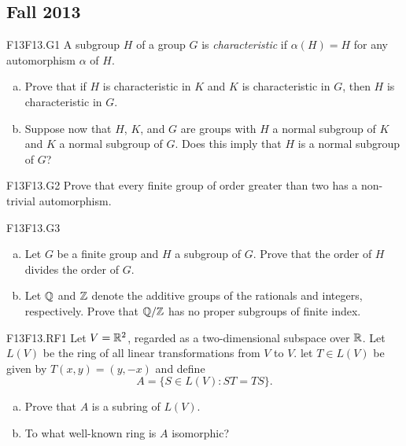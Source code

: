 \documentclass[../AlgebraQualSolutions.tex]{subfiles}
\begin{document}
	\subsection{Fall 2013}

	\begin{prob}{F13}{F13.G1}
		A subgroup $H$ of a group $G$ is \emph{characteristic} if $\alpha(H) = H$ for any automorphism $\alpha$ of $H$.
		
		\begin{enumerate}[(a)]
			\item Prove that if $H$ is characteristic in $K$ and $K$ is characteristic in $G$, then $H$ is characteristic in $G$.
			\item Suppose now that $H$, $K$, and $G$ are groups with $H$ a normal subgroup of $K$ and $K$ a normal subgroup of $G$. Does this imply that $H$ is a normal subgroup of $G$?
		\end{enumerate}
	\end{prob}

	\begin{prob}{F13}{F13.G2}
		Prove that every finite group of order greater than two has a non-trivial automorphism.
	\end{prob}

	\begin{prob}{F13}{F13.G3}

		\begin{enumerate}[(a)]
			\item Let $G$ be a finite group and $H$ a subgroup of $G$. Prove that the order of $H$ divides the order of $G$.
			\item  Let $\mathbb{Q}$ and $\mathbb{Z}$ denote the additive groups of the rationals and integers, respectively. Prove that $\mathbb{Q}/\mathbb{Z}$ has no proper subgroups of finite index.
		\end{enumerate}
	\end{prob}

	\begin{prob}{F13}{F13.RF1}
		Let $V = \mathbb{R}^2$, regarded as a two-dimensional subspace over $\mathbb{R}$. Let $L(V)$ be the ring of all linear transformations from $V$ to $V$. let $T \in L(V)$ be given by $T(x,y) = (y,-x)$ and define 
			\[A = \{S \in L(V): ST = TS\}. \]
		\begin{enumerate}[(a)]
			\item Prove that $A$ is a subring of $L(V)$.
			\item To what well-known ring is $A$ isomorphic?
		\end{enumerate}
	\end{prob}
\end{document}
